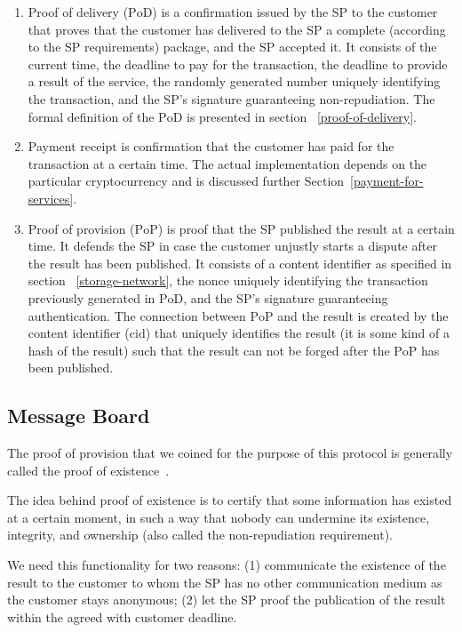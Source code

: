\begin{enumerate}
    \item Proof of delivery ($\mathrm{PoD}$) is a confirmation issued by the SP to the customer that proves that the customer has delivered to the SP a complete (according to the SP requirements) package, and the SP accepted it. It consists of the current time, the deadline to pay for the transaction, the deadline to provide a result of the service, the randomly generated number uniquely identifying the transaction, and the SP's signature guaranteeing non-repudiation. The formal definition of the $\mathrm{PoD}$ is presented in section ~\ref{proof-of-delivery}.
    
    \item Payment $\mathrm{receipt}$ is confirmation that the customer has paid for the transaction at a certain time. The actual implementation depends on the particular cryptocurrency and is discussed further Section~\ref{payment-for-services}.
    
    \item Proof of provision ($\mathrm{PoP}$) is proof that the SP published the result at a certain time. It defends the SP in case the customer unjustly starts a dispute after the result has been published. It consists of a content identifier as specified in section ~\ref{storage-network}, the $\mathrm{nonce}$ uniquely identifying the transaction previously generated in $\mathrm{PoD}$, and the SP's signature guaranteeing authentication. The connection between $\mathrm{PoP}$ and the result is created by the content identifier ($\mathrm{cid}$) that uniquely identifies the result (it is some kind of a hash of the result) such that the result can not be forged after the $\mathrm{PoP}$ has been published.
\end{enumerate}

\subsection{Message Board}\label{sec:message-board}
The proof of provision that we coined for the purpose of this protocol is generally called the proof of existence~\cite{crespoStamperyBlockchainTimestamping2017}.

The idea behind proof of existence is to certify that some information
has existed at a certain moment, in such a way that nobody can
undermine its existence, integrity, and ownership (also called the
non-repudiation requirement).


We need this functionality for two reasons: (1) communicate the existence of the result to the customer to whom the SP has no other communication medium as the customer stays anonymous; (2) let the SP proof the publication of the result within the agreed with customer deadline. 

